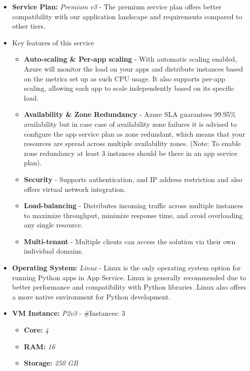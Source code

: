 \documentclass{llncs}
\begin{document}
\begin{itemize}
    \item \textbf{Service Plan:} \textit{Premium v3} - The premium service plan offers better compatibility with our application landscape and requirements compared to other tiers.
    \item Key features of this service
          \begin{itemize}
              \item \textbf{Auto-scaling \& Per-app scaling} - With automatic scaling enabled, Azure will monitor the load on your apps and distribute instances based on the metrics set up as such CPU usage. It also supports per-app scaling, allowing each app to scale independently based on its specific load.
              \item \textbf{Availability \& Zone Redundancy} - Azure SLA guarantees 99.95\% availability but in case case of availability zone failures it is advised to configure the app service plan as zone redundant, which means that your resources are spread across multiple availability zones. (Note: To enable zone redundancy at least 3 instances should be there in an app service plan).
              \item \textbf{Security} - Supports authentication, and IP address restriction and also offers virtual network integration.
              \item \textbf{Load-balancing} - Distributes incoming traffic across multiple instances to maximize throughput, minimize response time, and avoid overloading any single resource.
              \item \textbf{Multi-tenant} - Multiple clients can access the solution via their own individual domains.
          \end{itemize}

    \item \textbf{Operating System:} \textit{Linux} - Linux is the only operating system option for running Python apps in App Service. Linux is generally recommended due to better performance and compatibility with Python libraries
          .Linux also offers a more native environment for Python development\cite{azure-python}.

    \item \textbf{VM Instance:} \textit{P2v3} - \#Instances: 3

          \begin{itemize}
              \item \textbf{Core:} \textit{4}
              \item \textbf{RAM:} \textit{16}
              \item \textbf{Storage:} \textit{250 GB}
          \end{itemize}
\end{itemize}
\end{document}
